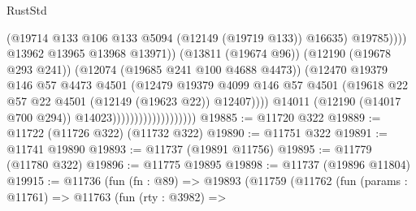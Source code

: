 \begin{lexlean}{RustStd}
\begin{coremodule}
                                                        (@19714
                                                          @133
                                                          @106
                                                          @133
                                                          @5094
                                                          (@12149 (@19719 @133))
                                                          @16635)
                                                        @19785))))
                                                @13962
                                                @13965
                                                @13968
                                                @13971))
                                            (@13811 (@19674 @96))
                                            (@12190 (@19678 @293 @241))
                                            (@12074 (@19685 @241 @100 @4688 @4473))
                                            (@12470
                                              @19379
                                              @146
                                              @57
                                              @4473
                                              @4501
                                              (@12479
                                                @19379
                                                @4099
                                                @146
                                                @57
                                                @4501
                                                (@19618
                                                  @22
                                                  @57
                                                  @22
                                                  @4501
                                                  (@12149 (@19623 @22))
                                                  @12407))))
                                          @14011
                                          (@12190 (@14017 @700 @294))
                                          @14023)))))))))))))))))))
@19885 := @11720 @322
@19889 := @11722 (@11726 @322) (@11732 @322)
@19890 := @11751 @322
@19891 := @11741 @19890
@19893 := @11737 (@19891 @11756)
@19895 := @11779 (@11780 @322)
@19896 := @11775 @19895
@19898 := @11737 (@19896 @11804)
@19915 := @11736
    (fun (fn : @89) =>
    @19893
      (@11759
        (@11762
          (fun (params : @11761) =>
          @11763
            (fun (rty : @3982) =>

\end{coremodule}
\end{lexlean}
